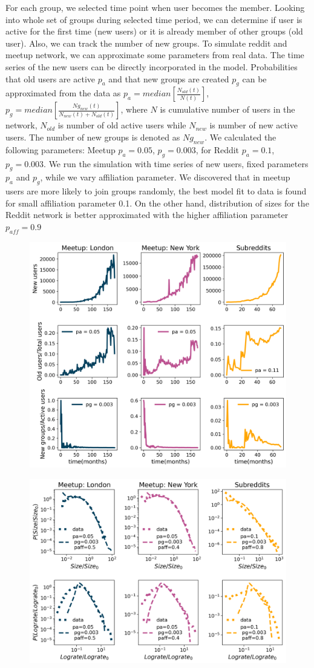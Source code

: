 For each group, we selected time point when user becomes the member. Looking into whole set of groups during selected time period, we can determine if user is active for the first time (new users) or it is already member of other groups (old user). Also, we can track the number of new groups. To simulate reddit and meetup network, we can approximate some parameters from real data. The time series of the new users can be directly incorporated in the model. Probabilities that old users are active $p_a$ and that new groups are created $p_g$ can be approximated from the data as $p_a = median [\frac{N_{old}(t)}{N(t)}]$, 
$p_g = median [\frac{Ng_{new}(t)}{N_{new}(t)+N_{old}(t)}]$, 
where $N$ is cumulative number of users in the network, $N_{old}$ is number of old active users while $N_{new}$ is number of new active users. The number of new groups is denoted as $Ng_{new}$.
We calculated the following parameters:
Meetup $p_a=0.05$, $p_g=0.003$, for Reddit $p_a=0.1$, $p_g=0.003$. 
We run the simulation with time series of new users, fixed parameters $p_a$ and $p_g$, while we vary affiliation parameter. We discovered that in meetup users are more likely to join groups randomly, the best model fit to data is found for small affiliation parameter 0.1. On the other hand, distribution of sizes for the Reddit network is better approximated with the higher affiliation parameter $p_{aff}=0.9$



\begin{figure}[h!]
	\centering
	\includegraphics[width=0.6\linewidth]{Figures/Fig3.png}
	\caption{}
	\label{fig:fig3}
\end{figure}

\begin{figure}[h!]
	\centering
	\includegraphics[width=0.6\linewidth]{Figures/Fig4.png}
	\caption{}
	\label{fig:fig4}
\end{figure}


